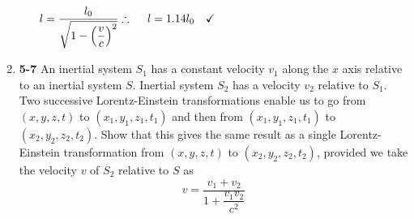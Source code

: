 \documentclass[fleqn]{article}
\begin{document}
\begin{enumerate}
\begin{enumerate}
        \textcolor{hwColor}{
          $
            l=\dfrac{l_0}{\sqrt{1-\left(\dfrac{v}{c}\right)^2}}
            \\
            \\
            \\
            \therefore ~~~~ l=1.14 l_0 ~~~ \checkmark
          $
        }

    \end{enumerate}

    \pagebreak

    \item \textbf{5-7} An inertial system $S_1$ has a constant velocity $v_1$ along the $x$ axis relative to an inertial system $S$.
    Inertial system $S_2$ has a velocity $v_2$ relative to $S_1$. Two successive Lorentz-Einstein transformations enable us to
    go from $(x, y, z, t)$ to $(x_1, y_1, z_1, t_1)$ and then from $(x_1, y_1, z_1, t_1)$ to $(x_2, y_2, z_2, t_2)$. Show that 
    this gives the same result as a single Lorentz-Einstein transformation from $(x, y, z, t)$ to $(x_2, y_2, z_2, t_2)$,
    provided we take the velocity $v$ of $S_2$ relative to $S$ as
    $$v=\dfrac{v_1+v_2}{1+\dfrac{v_1 v_2}{c^2}}$$


\end{enumerate}
\end{document}
